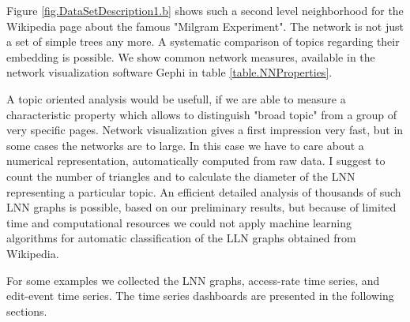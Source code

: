 \documentclass[a4paper,10pt]{scrbook}
\begin{document}
\label{ext.fig.DataSetDescription1.b} 


Figure \ref{fig.DataSetDescription1.b} shows such a second level neighborhood for the Wikipedia page about the famous "Milgram Experiment". The network is not just a set of simple trees any more. A systematic comparison of topics regarding their embedding is possible. We show common network measures, available in the network visualization software Gephi \cite{ICWSM09154} in table \ref{table.NNProperties}.

\label{ext.fig.DataSetDescription1.c} 


A topic oriented analysis would be usefull, if we are able to measure a characteristic property which allows to distinguish "broad topic" from a group of very specific pages. Network visualization gives a first impression very fast, but in some cases the networks are to large. In this case we have to care about a numerical representation, automatically computed from raw data. I suggest to count the number of triangles and to calculate the diameter of the LNN representing a particular topic. An efficient detailed analysis of thousands of such LNN graphs is possible, based on our preliminary results, but because of limited time and computational resources we could not apply machine learning algorithms for automatic classification of the LLN graphs obtained from Wikipedia.   

For some examples we collected the LNN graphs, access-rate time series, and edit-event time series. The time series dashboards are presented in the following sections.
 
\label{ext.table.NNProperties} 

\end{document}
